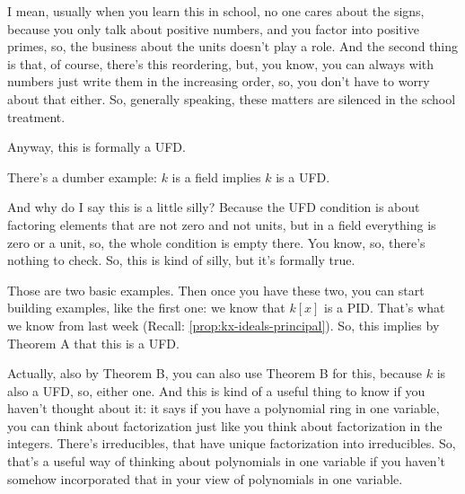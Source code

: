 \begin{speech}[00:18:35 - 00:21:02]
I mean, usually when you learn this in school, no one cares about the signs, because you only talk about positive numbers, and you factor into positive primes, so, the business about the units doesn't play a role. And the second thing is that, of course, there's this reordering, but, you know, you can always with numbers just write them in the increasing order, so, you don't have to worry about that either. So, generally speaking, these matters are silenced in the school treatment.

Anyway, this is formally a UFD.

There's a dumber example:  $k$ is a field implies $k$ is a UFD. 

And why do I say this is a little silly? Because the UFD condition is about factoring elements that are not zero and not units, but in a field everything is zero or a unit, so, the whole condition is empty there.  You know, so, there's nothing to check. So, this is kind of silly, but it's formally true.

Those are two basic examples. Then once you have these two, you can start building examples, like the first one: we know that $k[x]$ is a PID.  That's what we know from last week (Recall: \cref{prop:kx-ideals-principal}). So, this implies by Theorem A  that this is a UFD.

Actually, also by Theorem B,  you can also use Theorem B for this, because $k$ is also a UFD, so, either one. And this is kind of a useful thing to know if you haven't thought about it: it says if you have a polynomial ring in one variable, you can think about factorization just like you think about factorization in the integers. There's irreducibles, that have unique factorization into irreducibles. So, that's a useful way of thinking about polynomials in one variable if you haven't somehow incorporated that in your view of polynomials in one variable.
\end{speech}

